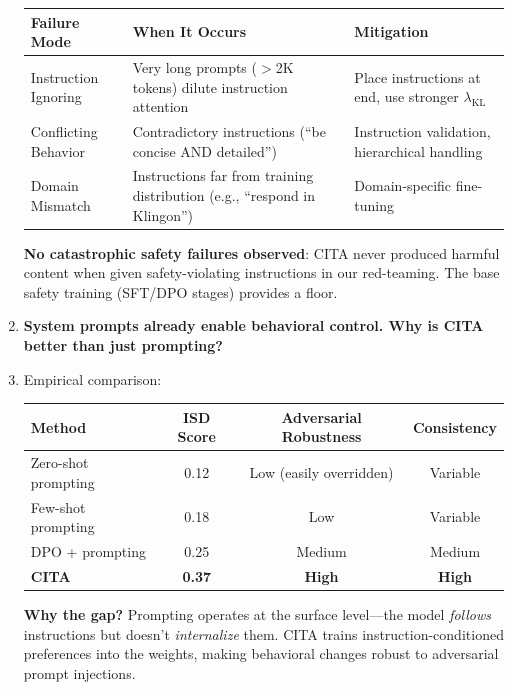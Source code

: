\begin{enumerate}[label=\textbf{Q\arabic*.}, leftmargin=*, itemsep=8pt]
\begin{table}[H]
\centering
\small
\begin{tabular}{@{}lp{5cm}p{5cm}@{}}
\toprule
\textbf{Failure Mode} & \textbf{When It Occurs} & \textbf{Mitigation} \\
\midrule
Instruction Ignoring & Very long prompts ($>$2K tokens) dilute instruction attention & Place instructions at end, use stronger $\lambda_{\text{KL}}$ \\
\hline
Conflicting Behavior & Contradictory instructions (``be concise AND detailed'') & Instruction validation, hierarchical handling \\
\hline
Domain Mismatch & Instructions far from training distribution (e.g., ``respond in Klingon'') & Domain-specific fine-tuning \\
\bottomrule
\end{tabular}
\end{table}

\textbf{No catastrophic safety failures observed}: CITA never produced harmful content when given safety-violating instructions in our red-teaming. The base safety training (SFT/DPO stages) provides a floor.

\vspace{4mm}

\item[\ding{93}] \textbf{System prompts already enable behavioral control. Why is CITA better than just prompting?}

\item[\ding{224}] Empirical comparison:

\begin{table}[H]
\centering
\small
\begin{tabular}{@{}lccc@{}}
\toprule
\textbf{Method} & \textbf{ISD Score} & \textbf{Adversarial Robustness} & \textbf{Consistency} \\
\midrule
Zero-shot prompting & 0.12 & Low (easily overridden) & Variable \\
\hline
Few-shot prompting & 0.18 & Low & Variable \\
\hline
DPO + prompting & 0.25 & Medium & Medium \\
\hline
\textbf{CITA} & \textbf{0.37} & \textbf{High} & \textbf{High} \\
\bottomrule
\end{tabular}
\end{table}

\textbf{Why the gap?} Prompting operates at the surface level---the model \textit{follows} instructions but doesn't \textit{internalize} them. CITA trains instruction-conditioned preferences into the weights, making behavioral changes robust to adversarial prompt injections.


\end{enumerate}
